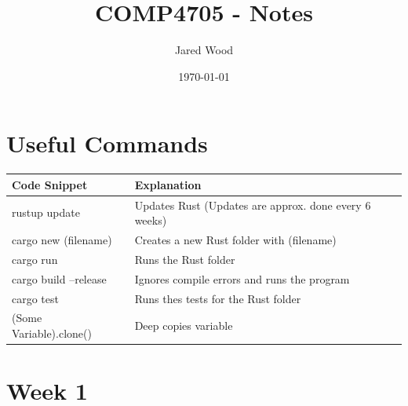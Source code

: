 \documentclass[11pt]{article}
\title{COMP4705 - Notes}
\author{Jared Wood}
\date{\today}
\begin{document}
\hypertarget{toc}{}
\maketitle
\tableofcontents


\newpage
\section{Useful Commands}

\begin{tabularx}{\textwidth}{X | X}
  \toprule
  Code Snippet & Explanation \\
  \midrule
  rustup update & Updates Rust (Updates are approx. done every 6 weeks) \\
  cargo new (filename) & Creates a new Rust folder with (filename) \\
  cargo run & Runs the Rust folder \\
  cargo build --release & Ignores compile errors and runs the program \\
  cargo test & Runs thes tests for the Rust folder \\
  (Some Variable).clone() & Deep copies variable \\
  \bottomrule
\end{tabularx}


\newpage
\section{Week 1}

\end{document}
